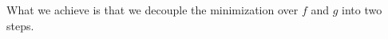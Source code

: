 What we achieve is that we decouple the minimization over $f$ and $g$ into two steps. 
%
%
%
%
%
%
%
%
%
%
